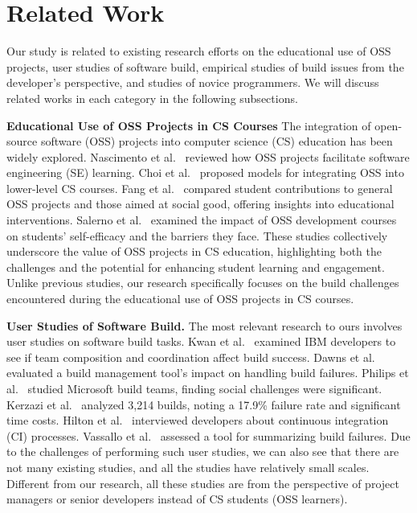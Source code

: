\section{Related Work}
\label{sec:related}

Our study is related to existing research efforts on the educational use of OSS projects, user studies of software build, empirical studies of build issues from the developer's perspective, and studies of novice programmers. We will discuss related works in each category in the following subsections.

\textbf{Educational Use of OSS Projects in CS Courses}
The integration of open-source software (OSS) projects into computer science (CS) education has been widely explored. 
Nascimento et al.~\cite{nascimento2015open} reviewed how OSS projects facilitate software engineering (SE) learning. 
Choi et al.~\cite{choi2021open} proposed models for integrating OSS into lower-level CS courses. 
Fang et al.~\cite{Fang_Endres_Zimmermann_Ford_Weimer_Leach_Huang_2023} compared student contributions to general OSS projects and those aimed at social good, offering insights into educational interventions. 
Salerno et al.~\cite{Salerno_de2023} examined the impact of OSS development courses on students' self-efficacy and the barriers they face. 
These studies collectively underscore the value of OSS projects in CS education, highlighting both the challenges and the potential for enhancing student learning and engagement. Unlike previous studies, our research specifically focuses on the build challenges encountered during the educational use of OSS projects in CS courses.

\textbf{User Studies of Software Build.} The most relevant research to ours involves user studies on software build tasks. 
Kwan et al.~\cite{kwan2011does} examined IBM developers to see if team composition and coordination affect build success. 
Dawns et al.~\cite{downs2012ambient} evaluated a build management tool's impact on handling build failures.
Philips et al.~\cite{phillips2014understanding} studied Microsoft build teams, finding social challenges were significant.
Kerzazi et al.~\cite{kerzazi2014automated} analyzed 3,214 builds, noting a 17.9\% failure rate and significant time costs.
Hilton et al.~\cite{hilton2016continuous} interviewed developers about continuous integration (CI) processes.
Vassallo et al.~\cite{vassallo2020every} assessed a tool for summarizing build failures. 
Due to the challenges of performing such user studies, we can also see that there are not many existing studies, and all the studies have relatively small scales. 
Different from our research, all these studies are from the perspective of project managers or senior developers instead of CS students (OSS learners). 


